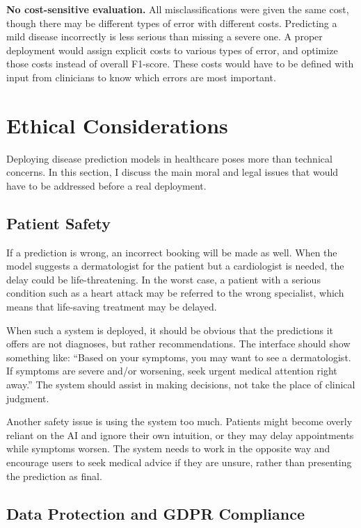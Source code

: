 \textbf{No cost-sensitive evaluation.} All misclassifications were given the same cost, though there may be different types of error with different costs. Predicting a mild disease incorrectly is less serious than missing a severe one. A proper deployment would assign explicit costs to various types of error, and optimize those costs instead of overall F1-score. These costs would have to be defined with input from clinicians to know which errors are most important.

\section{Ethical Considerations}
\label{sec:ethics}

Deploying disease prediction models in healthcare poses more than technical concerns. In this section, I discuss the main moral and legal issues that would have to be addressed before a real deployment.

\subsection{Patient Safety}

If a prediction is wrong, an incorrect booking will be made as well. When the model suggests a dermatologist for the patient but a cardiologist is needed, the delay could be life-threatening. In the worst case, a patient with a serious condition such as a heart attack may be referred to the wrong specialist, which means that life-saving treatment may be delayed.

When such a system is deployed, it should be obvious that the predictions it offers are not diagnoses, but rather recommendations. The interface should show something like: ``Based on your symptoms, you may want to see a dermatologist. If symptoms are severe and/or worsening, seek urgent medical attention right away.'' The system should assist in making decisions, not take the place of clinical judgment.

Another safety issue is using the system too much. Patients might become overly reliant on the AI and ignore their own intuition, or they may delay appointments while symptoms worsen. The system needs to work in the opposite way and encourage users to seek medical advice if they are unsure, rather than presenting the prediction as final.

\subsection{Data Protection and GDPR Compliance}

